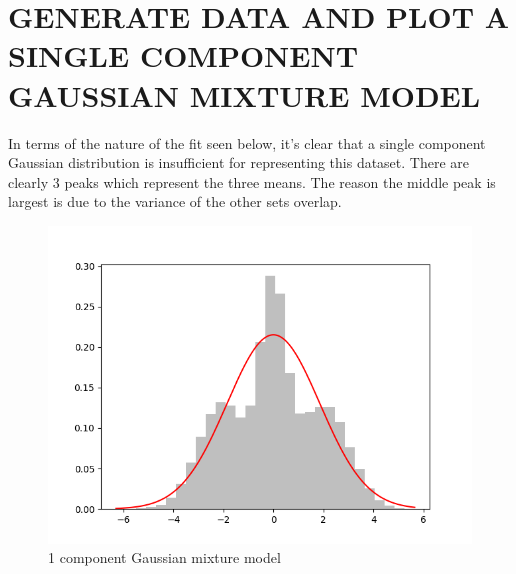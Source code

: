 \documentclass{article}
\begin{document}
\section{\MakeUppercase{Generate Data and plot a single component Gaussian mixture model}}
In terms of the nature of the fit seen below, it's clear that a single component Gaussian distribution is insufficient for representing this dataset. There are clearly 3 peaks which represent the three means. The reason the middle peak is largest is due to the variance of the other sets overlap.
\begin{figure}[!htb]
	\centering
	\begin{minipage}{0.49\textwidth}
			\centering
			\includegraphics[width=1\linewidth]{../q1to6pics/q1.png}
			\caption{1 component Gaussian mixture model}
	\end{minipage}\hfill
\end{figure}
\pagebreak
\end{document}
